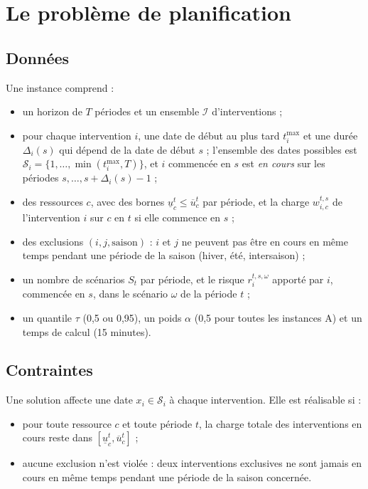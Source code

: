 \documentclass[11pt,a4paper]{report}
\newcommand{\I}{\mathcal{I}}
\newcommand{\Sd}{\mathcal{S}}
\begin{document}
\chapter{Le problème de planification}\label{chap:probleme}

\section{Données}

Une instance comprend :
\begin{itemize}
  \item un horizon de $T$ périodes et un ensemble $\I$ d'interventions ;
  \item pour chaque intervention $i$, une date de début au plus tard $t^{\max}_i$ et une durée
        $\Delta_i(s)$ qui dépend de la date de début $s$ ; l'ensemble des dates possibles est
        $\Sd_i = \{1, \dots, \min(t^{\max}_i, T)\}$, et $i$ commencée en $s$ est \emph{en cours}
        sur les périodes $s, \dots, s + \Delta_i(s) - 1$ ;
  \item des ressources $c$, avec des bornes $\underline{u}_c^t \le \overline{u}_c^t$ par période, et
        la charge $w_{i,c}^{t,s}$ de l'intervention $i$ sur $c$ en $t$ si elle commence en $s$ ;
  \item des exclusions $(i, j, \text{saison})$ : $i$ et $j$ ne peuvent pas être en cours en même
        temps pendant une période de la saison (hiver, été, intersaison) ;
  \item un nombre de scénarios $S_t$ par période, et le risque $r_{i}^{t,s,\omega}$ apporté par $i$,
        commencée en $s$, dans le scénario $\omega$ de la période $t$ ;
  \item un quantile $\tau$ (0,5 ou 0,95), un poids $\alpha$ (0,5 pour toutes les instances A) et un
        temps de calcul (15 minutes).
\end{itemize}

\section{Contraintes}

Une solution affecte une date $x_i \in \Sd_i$ à chaque intervention. Elle est réalisable si :
\begin{itemize}
  \item pour toute ressource $c$ et toute période $t$, la charge totale des interventions en cours
        reste dans $[\underline{u}_c^t, \overline{u}_c^t]$ ;
  \item aucune exclusion n'est violée : deux interventions exclusives ne sont jamais en cours en même
        temps pendant une période de la saison concernée.
\end{itemize}
\end{document}
